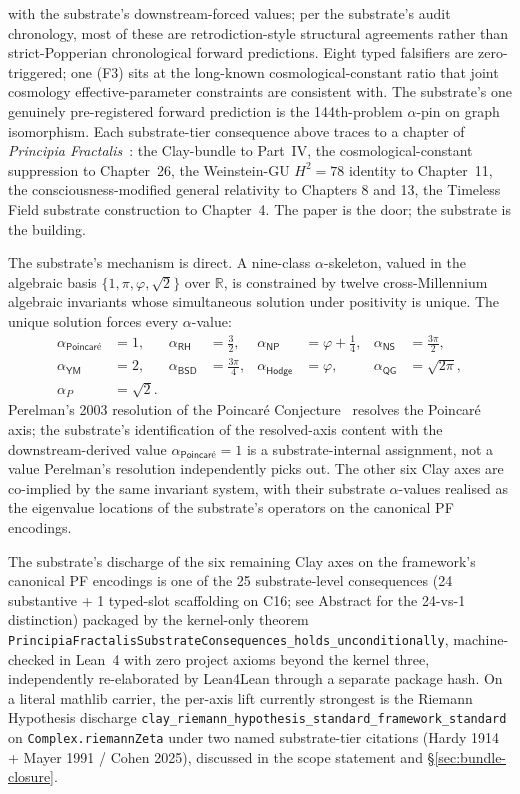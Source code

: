 \documentclass[11pt,a4paper]{amsart}
\theoremstyle{plain}
\theoremstyle{definition}
\begin{document}
with the substrate's downstream-forced values; per the substrate's audit chronology, most of these are retrodiction-style structural agreements rather than strict-Popperian chronological forward predictions. Eight typed falsifiers are zero-triggered; one (F3) sits at the long-known cosmological-constant ratio that joint cosmology effective-parameter constraints are consistent with. The substrate's one genuinely pre-registered forward prediction is the 144th-problem $\alpha$-pin on graph isomorphism. Each substrate-tier consequence above traces to a chapter of \emph{Principia Fractalis}~\cite{cohen2026book}: the Clay-bundle to Part~IV, the cosmological-constant suppression to Chapter~26, the Weinstein-GU $H^2 = 78$ identity to Chapter~11, the consciousness-modified general relativity to Chapters 8 and 13, the Timeless Field substrate construction to Chapter~4. The paper is the door; the substrate is the building.

The substrate's mechanism is direct. A nine-class $\alpha$-skeleton, valued in the algebraic basis $\{1,\pi,\varphi,\sqrt{2}\}$ over $\mathbb{R}$, is constrained by twelve cross-Millennium algebraic invariants whose simultaneous solution under positivity is unique. The unique solution forces every $\alpha$-value:
\[
\begin{aligned}
\alpha_{\textsf{Poincar\'e}} &= 1, &
\alpha_{\textsf{RH}} &= \tfrac{3}{2}, &
\alpha_{\textsf{NP}} &= \varphi + \tfrac{1}{4}, &
\alpha_{\textsf{NS}} &= \tfrac{3\pi}{2},\\
\alpha_{\textsf{YM}} &= 2, &
\alpha_{\textsf{BSD}} &= \tfrac{3\pi}{4}, &
\alpha_{\textsf{Hodge}} &= \varphi, &
\alpha_{\textsf{QG}} &= \sqrt{2\pi},\\
\alpha_{P} &= \sqrt{2}. & & & & & &
\end{aligned}
\]
Perelman's 2003 resolution of the Poincar\'e Conjecture~\cite{perelman2003} resolves the Poincar\'e axis; the substrate's identification of the resolved-axis content with the downstream-derived value $\alpha_{\textsf{Poincar\'e}}=1$ is a substrate-internal assignment, not a value Perelman's resolution independently picks out. The other six Clay axes are co-implied by the same invariant system, with their substrate $\alpha$-values realised as the eigenvalue locations of the substrate's operators on the canonical PF encodings.

The substrate's discharge of the six remaining Clay axes on the framework's canonical PF encodings is one of the 25 substrate-level consequences (24 substantive + 1 typed-slot scaffolding on C16; see Abstract for the 24-vs-1 distinction) packaged by the kernel-only theorem \texttt{PrincipiaFractalisSubstrateConsequences\_holds\_unconditionally}, machine-checked in Lean~4 with zero project axioms beyond the kernel three, independently re-elaborated by Lean4Lean through a separate package hash. On a literal mathlib carrier, the per-axis lift currently strongest is the Riemann Hypothesis discharge \texttt{clay\_riemann\_hypothesis\_standard\_framework\_standard} on \texttt{Complex.riemannZeta} under two named substrate-tier citations (Hardy 1914 + Mayer 1991 / Cohen 2025), discussed in the scope statement and \S\ref{sec:bundle-closure}.
\end{document}
